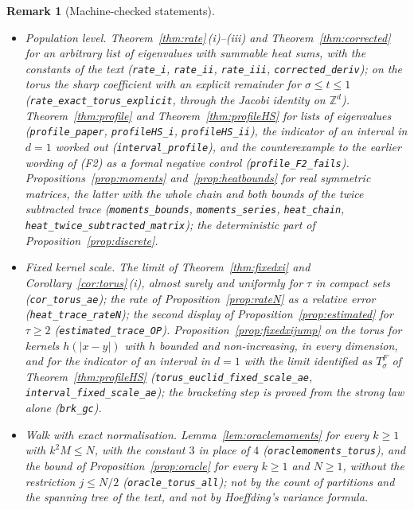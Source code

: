 \documentclass[11pt,a4paper]{article}
\theoremstyle{stmt}
\theoremstyle{defn}
\theoremstyle{rmk}
\newtheorem{remark}[theorem]{Remark}
\numberwithin{equation}{section}
\begin{document}
{\begin{remark}[Machine-checked statements]
\begin{itemize}
\item \emph{Population level.} Theorem~\ref{thm:rate}\,(i)--(iii) and Theorem~\ref{thm:corrected} for an arbitrary list of eigenvalues with summable heat sums, with the constants of the text (\texttt{rate\_i}, \texttt{rate\_ii}, \texttt{rate\_iii}, \texttt{corrected\_deriv}); on the torus the sharp coefficient with an explicit remainder for $\sigma\le t\le1$ (\texttt{rate\_exact\_torus\_explicit}, through the Jacobi identity on $\mathbb Z^d$). Theorem~\ref{thm:profile} and Theorem~\ref{thm:profileHS} for lists of eigenvalues (\texttt{profile\_paper}, \texttt{profileHS\_i}, \texttt{profileHS\_ii}), the indicator of an interval in $d=1$ worked out (\texttt{interval\_profile}), and the counterexample to the earlier wording of \textup{(F2)} as a formal negative control (\texttt{profile\_F2\_fails}). Propositions~\ref{prop:moments} and~\ref{prop:heatbounds} for real symmetric matrices, the latter with the whole chain and both bounds of the twice subtracted trace (\texttt{moments\_bounds}, \texttt{moments\_series}, \texttt{heat\_chain}, \texttt{heat\_twice\_subtracted\_matrix}); the deterministic part of Proposition~\ref{prop:discrete}.
\item \emph{Fixed kernel scale.} The limit of Theorem~\ref{thm:fixedxi} and Corollary~\ref{cor:torus}\,(i), almost surely and uniformly for $\tau$ in compact sets (\texttt{cor\_torus\_ae}); the rate of Proposition~\ref{prop:rateN} as a relative error (\texttt{heat\_trace\_rateN}); the second display of Proposition~\ref{prop:estimated} for $\tau\ge2$ (\texttt{estimated\_trace\_OP}). Proposition~\ref{prop:fixedxijump} on the torus for kernels $h(|x-y|)$ with $h$ bounded and non-increasing, in every dimension, and for the indicator of an interval in $d=1$ with the limit identified as $T^F_\sigma$ of Theorem~\ref{thm:profileHS} (\texttt{torus\_euclid\_fixed\_scale\_ae}, \texttt{interval\_fixed\_scale\_ae}); the bracketing step is proved from the strong law alone (\texttt{brk\_gc}).
\item \emph{Walk with exact normalisation.} Lemma~\ref{lem:oraclemoments} for every $k\ge1$ with $k^2M\le N$, with the constant $3$ in place of $4$ (\texttt{oraclemoments\_torus}), and the bound of Proposition~\ref{prop:oracle} for every $k\ge1$ and $N\ge1$, without the restriction $j\le N/2$ (\texttt{oracle\_torus\_all}); not by the count of partitions and the spanning tree of the text, and not by Hoeffding's variance formula.

\end{itemize}
\end{remark}}
\end{document}
